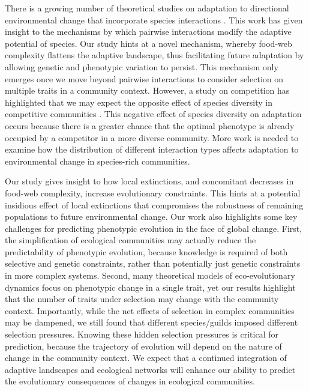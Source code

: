 \documentclass[11pt,]{article}
\begin{document}
There is a growing number of theoretical studies on adaptation to
directional environmental change that incorporate species interactions
\citep[e.g.][]{deMazancourt2008, Johansson2008, Norberg2012, Osmond2017PredatorsHelpPrey}.
This work has given insight to the mechanisms by which pairwise
interactions modify the adaptive potential of species. Our study hints
at a novel mechanism, whereby food-web complexity flattens the adaptive
landscape, thus facilitating future adaptation by allowing genetic and
phenotypic variation to persist. This mechanism only emerges once we
move beyond pairwise interactions to consider selection on multiple
traits in a community context. However, a study on competition has
highlighted that we may expect the opposite effect of species diversity
in competitive communities \citep{deMazancourt2008}. This negative
effect of species diversity on adaptation occurs because there is a
greater chance that the optimal phenotype is already occupied by a
competitor in a more diverse community. More work is needed to examine
how the distribution of different interaction types affects adaptation
to environmental change in species-rich communities.

Our study gives insight to how local extinctions, and concomitant
decreases in food-web complexity, increase evolutionary constraints.
This hints at a potential insidious effect of local extinctions that
compromises the robustness of remaining populations to future
environmental change. Our work also highlights some key challenges for
predicting phenotypic evolution in the face of global change. First, the
simplification of ecological communities may actually reduce the
predictability of phenotypic evolution, because knowledge is required of
both selective and genetic constraints, rather than potentially just
genetic constraints in more complex systems. Second, many theoretical
models of eco-evolutionary dynamics focus on phenotypic change in a
single trait, yet our results highlight that the number of traits under
selection may change with the community context. Importantly, while the
net effects of selection in complex communities may be dampened, we
still found that different species/guilds imposed different selection
pressures. Knowing these hidden selection pressures is critical for
prediction, because the trajectory of evolution will depend on the
nature of change in the community context. We expect that a continued
integration of adaptive landscapes and ecological networks will enhance
our ability to predict the evolutionary consequences of changes in
ecological communities.
\end{document}
